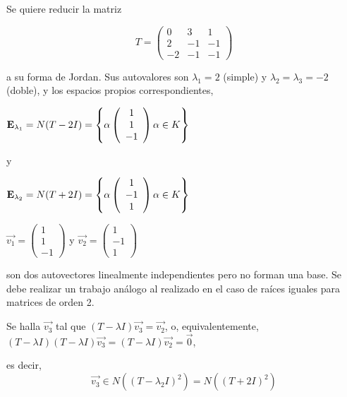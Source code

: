 \begin{example}
Se quiere  reducir la matriz 



 $$T=\left(\begin{array}{ccc} 0 & 3 & 1  \\ 2  & -1 & -1
\\ -2  & -1 & -1
\end{array}
 \right)$$ 

\bigskip

\noindent
a su forma de Jordan. Sus autovalores son $\lambda_1=2$ (simple) y  $\lambda_2=\lambda_3=-2$  (doble), y los espacios propios correspondientes,

\bigskip

$\bold E_{\lambda_1}=N(T-2 I )=\left\{\alpha   \left(\begin{array}{c} 1 \\ 1 
\\  -1
\end{array} \right)    \alpha \in K    \right\}$

\noindent 
y




$\bold E_{\lambda_2}=N(T+2 I )=\left\{\alpha   \left(\begin{array}{c} 1 \\ -1 
\\  1
\end{array} \right)    \alpha \in K    \right\}$

\bigskip


$\vec{v_1}=\left(\begin{array}{c} 1 \\ 1
\\ - 1 \end{array}\right)$ y $\vec{v_2}=\left(\begin{array}{c} 1 \\ -1
\\  1 \end{array}\right)$ 


\bigskip

\noindent 
son dos autovectores  linealmente independientes pero  no forman  una  base. Se debe realizar un trabajo análogo  al realizado en el caso de raíces iguales para matrices de orden 2.

Se halla $\vec{v_3}$ tal que $(T-\lambda I ) \vec{v_3}= \vec{v_2}$, 
o, equivalentemente,  $(T-\lambda I ) (T-\lambda I ) \vec{v_3}= (T-\lambda I )\vec{v_2}= \Vec{0}$, 

\noindent
es decir, 
$$\vec{v_3} \in N((T-\lambda_2 I )^2)=N((T+2 I )^2)$$


\end{example}

